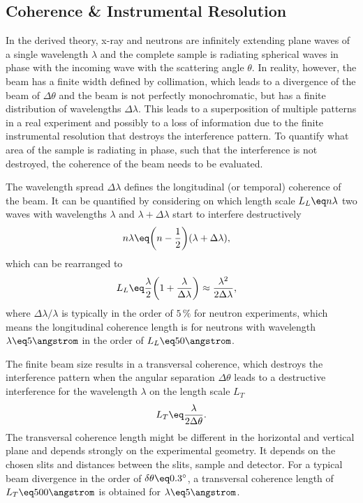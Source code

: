 \documentclass[\main/dresen_thesis.tex]{subfiles}
\begin{document}
  \subsection{Coherence \& Instrumental Resolution}\label{sec:theoreticalBackground:scattering:CoherenceInstrumentalResolution}
    In the derived theory, x-ray and neutrons are infinitely extending plane waves of a single wavelength $\lambda$ and the complete sample is radiating spherical waves in phase with the incoming wave with the scattering angle $\theta$.
    In reality, however, the beam has a finite width defined by collimation, which leads to a divergence of the beam of $\Delta \theta$ and the beam is not perfectly monochromatic, but has a finite distribution of wavelengths $\Delta \lambda$.
    This leads to a superposition of multiple patterns in a real experiment and possibly to a loss of information due to the finite instrumental resolution that destroys the interference pattern.
    To quantify what area of the sample is radiating in phase, such that the interference is not destroyed, the coherence of the beam needs to be evaluated.

    The wavelength spread $\Delta \lambda$ defines the longitudinal (or temporal) coherence of the beam. It can be quantified by considering on which length scale $L_L \eq n \lambda$ two waves with wavelengths $\lambda$ and $\lambda + \Delta \lambda$ start to interfere destructively
    \begin{align}
      n\lambda \eq& \biggl(n - \frac{1}{2} \biggr)(\lambda + \Delta \lambda),
    \end{align}
    which can be rearranged to
    \begin{align}
      L_L \eq& \frac{\lambda}{2} \biggl(1 + \frac{\lambda}{\Delta \lambda} \biggr) \approx \frac{\lambda^2}{2 \Delta \lambda},
    \end{align}
    where $\Delta \lambda / \lambda$ is typically in the order of $5\, \%$ for neutron experiments, which means the longitudinal coherence length is for neutrons with wavelength $\lambda \eq 5 \angstrom$ in the order of $L_L \eq 50 \angstrom$.

    The finite beam size results in a transversal coherence, which destroys the interference pattern when the angular separation $\Delta \theta$ leads to a destructive interference for the wavelength $\lambda$ on the length scale $L_T$
    \begin{align}
      L_T \eq \frac{\lambda}{2 \Delta\theta}.
    \end{align}
    The transversal coherence length might be different in the horizontal and vertical plane and depends strongly on the experimental geometry.
    It depends on the chosen slits and distances between the slits, sample and detector.
    For a typical beam divergence in the order of $\delta \theta \eq 0.3^\circ$, a transversal coherence length of $L_T \eq 500 \angstrom$ is obtained for $\lambda \eq 5 \angstrom$.
\end{document}
